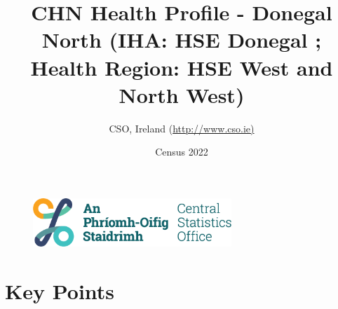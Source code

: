 \documentclass{article}
\title{CHN Health Profile - Donegal North (IHA: HSE Donegal ;  Health Region: HSE West and North West) }
\date{Census 2022}
\author{CSO, Ireland  (\url{http://www.cso.ie)}}
\begin{document}


\begin{figure}
	\centering
\includegraphics[width =75mm]{../figures/CSO_Logo.png}
\end{figure}

				 
		   
						  
														  
																																													
												 
			 
\maketitle
					
													   
				 
						 
																																																																											   
				 
				  
  \pagebreak
    	    \tableofcontents

\pagebreak


\section{Key Points}
\end{document}
